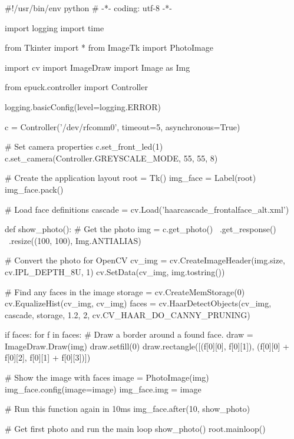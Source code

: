 \documentclass[12pt,notitlepage]{report}
\newenvironment{mylisting}{}{}
\begin{document}
\begin{mylisting}
\begin{pyc}
#!/usr/bin/env python
# -*- coding: utf-8 -*-

import logging
import time

from Tkinter import *
from ImageTk import PhotoImage

import cv
import ImageDraw
import Image as Img

from epuck.controller import Controller

logging.basicConfig(level=logging.ERROR)

c = Controller('/dev/rfcomm0', timeout=5, asynchronous=True)

# Set camera properties
c.set_front_led(1)
c.set_camera(Controller.GREYSCALE_MODE, 55, 55, 8)

# Create the application layout
root = Tk()
img_face = Label(root)
img_face.pack()

# Load face definitions
cascade = cv.Load('haarcascade_frontalface_alt.xml')

def show_photo():
    # Get the photo
    img = c.get_photo() \
        .get_response() \
        .resize((100, 100), Img.ANTIALIAS)

    # Convert the photo for OpenCV
    cv_img = cv.CreateImageHeader(img.size, cv.IPL_DEPTH_8U, 1)
    cv.SetData(cv_img, img.tostring())

    # Find any faces in the image
    storage = cv.CreateMemStorage(0)
    cv.EqualizeHist(cv_img, cv_img)
    faces = cv.HaarDetectObjects(cv_img, 
                cascade, 
                storage, 
                1.2, 2,
                cv.CV_HAAR_DO_CANNY_PRUNING)

    if faces:
        for f in faces:
            # Draw a border around a found face.
            draw = ImageDraw.Draw(img)
            draw.setfill(0)
            draw.rectangle([(f[0][0],
                             f[0][1]),
                            (f[0][0] + f[0][2],
                             f[0][1] + f[0][3])])

    # Show the image with faces
    image = PhotoImage(img)
    img_face.config(image=image)
    img_face.img = image

    # Run this function again in 10ms
    img_face.after(10, show_photo)

# Get first photo and run the main loop
show_photo()
root.mainloop()
\end{pyc}
\label{opencv}
\end{mylisting}
\end{document}
